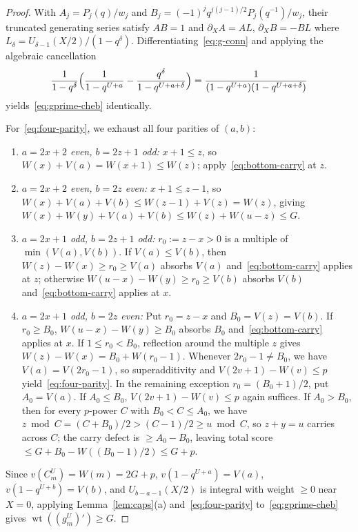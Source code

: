 \documentclass[11pt,reqno]{amsart}
\numberwithin{equation}{section}
\theoremstyle{definition}
\theoremstyle{remark}
\newcommand{\wt}{\operatorname{wt}}
\begin{document}
\begin{proof}
With $A_j = P_j(q)/w_j$ and $B_j = (-1)^j q^{j(j-1)/2}P_j(q^{-1})/w_j$, their truncated generating series satisfy $AB=1$ and $\partial_X A = A L$, $\partial_X B = -B L$ where $L_\delta = U_{\delta-1}(X/2)/(1-q^\delta)$. Differentiating~\eqref{eq:g-conn} and applying the algebraic cancellation
\[
\frac{1}{1-q^\delta}\Bigl(\frac{1}{1-q^{U+a}} - \frac{q^\delta}{1-q^{U+a+\delta}}\Bigr)
= \frac{1}{(1-q^{U+a})(1-q^{U+a+\delta})}
\]
yields~\eqref{eq:gprime-cheb} identically.

For~\eqref{eq:four-parity}, we exhaust all four parities of $(a,b)$:
\begin{enumerate}[label=(\arabic*),leftmargin=2em]
\item \emph{$a=2x+2$ even, $b=2z+1$ odd:} $x+1\le z$, so $W(x)+V(a)=W(x+1)\le W(z)$; apply~\eqref{eq:bottom-carry} at $z$.
\item \emph{$a=2x+2$ even, $b=2z$ even:} $x+1\le z-1$, so $W(x)+V(a)+V(b)\le W(z-1)+V(z)=W(z)$, giving $W(x)+W(y)+V(a)+V(b)\le W(z)+W(u-z)\le G$.
\item \emph{$a=2x+1$ odd, $b=2z+1$ odd:} $r_0:=z-x>0$ is a multiple of $\min(V(a),V(b))$. If $V(a)\le V(b)$, then $W(z)-W(x)\ge r_0\ge V(a)$ absorbs $V(a)$ and~\eqref{eq:bottom-carry} applies at $z$; otherwise $W(u-x)-W(y)\ge r_0\ge V(b)$ absorbs $V(b)$ and~\eqref{eq:bottom-carry} applies at $x$.
\item \emph{$a=2x+1$ odd, $b=2z$ even:} Put $r_0=z-x$ and $B_0=V(z)=V(b)$. If $r_0\ge B_0$, $W(u-x)-W(y)\ge B_0$ absorbs $B_0$ and~\eqref{eq:bottom-carry} applies at $x$. If $1\le r_0<B_0$, reflection around the multiple $z$ gives $W(z)-W(x)=B_0+W(r_0-1)$. Whenever $2r_0-1\ne B_0$, we have $V(a)=V(2r_0-1)$, so superadditivity and $V(2v+1)-W(v)\le p$ yield~\eqref{eq:four-parity}. In the remaining exception $r_0=(B_0+1)/2$, put $A_0=V(a)$. If $A_0\le B_0$, $V(2v+1)-W(v)\le p$ again suffices. If $A_0 > B_0$, then for every $p$-power $C$ with $B_0 < C \le A_0$, we have $z\bmod C = (C+B_0)/2 > (C-1)/2 \ge u\bmod C$, so $z+y=u$ carries across $C$; the carry defect is $\ge A_0 - B_0$, leaving total score $\le G + B_0 - W((B_0-1)/2) \le G + p$.
\end{enumerate}
Since $v(C_m^U)=W(m)=2G+p$, $v(1-q^{U+a})=V(a)$, $v(1-q^{U+b})=V(b)$, and $U_{b-a-1}(X/2)$ is integral with weight $\ge 0$ near $X=0$, applying Lemma~\ref{lem:caps}(a) and~\eqref{eq:four-parity} to~\eqref{eq:gprime-cheb} gives $\wt((g_m^U)')\ge G$.
\end{proof}
\end{document}
